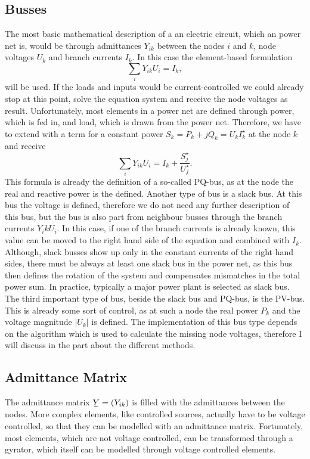 \subsection{Busses}
The most basic mathematical description of a an electric circuit, which an power net is, would be through admittances $Y_{ik}$ between the nodes $i$ and $k$, node voltages $U_k$ and branch currents $I_k$. In this case the element-based formulation
\begin{equation}
	\sum_i Y_{ik} U_i = I_k,
	\label{eq:current_controlled}
\end{equation}
will be used. If the loads and inputs would be current-controlled we could already stop at this point, solve the equation system and receive the node voltages as result. Unfortunately, most elements in a power net are defined through power, which is fed in, and load, which is drawn from the power net. Therefore, we have to extend  with a term for a constant power $S_k = P_k + j Q_k = U_k I_k^\star$ at the node $k$ and receive
\begin{equation}
	\sum_i Y_{ik} U_i = I_k + \frac{S_j^\star}{U_j^\star}.
	\label{eq:pq_bus}
\end{equation}
This formula is already the definition of a so-called PQ-bus, as at the node the real and reactive power is the defined.
Another type of bus is a slack bus. At this bus the voltage is defined, therefore we do not need any further description of this bus, but the bus is also part from neighbour busses through the branch currents $Y_ik U_i$. In this case, if one of the branch currents is already known, this value can be moved to the right hand side of the equation  and combined with $I_k$. Although, slack busses show up only in the constant currents of the right hand sides, there must be always at least one slack bus in the power net, as this bus then defines the rotation of the system and compensates mismatches in the total power sum. In practice, typically a major power plant is selected as slack bus.
The third important type of bus, beside the slack bus and PQ-bus, is the PV-bus. This is already some sort of control, as at such a node the real power $P_k$ and the voltage magnitude $|U_k|$ is defined. The implementation of this bus type depends on the algorithm which is used to calculate the missing node voltages, therefore I will discuss in the part about the different methods.

\subsection{Admittance Matrix}
The admittance matrix $\undertilde Y = (Y_{ik})$ is filled with the admittances between the nodes. More complex elements, like controlled sources, actually have to be voltage controlled, so that they can be modelled with an admittance matrix. Fortunately, most elements, which are not voltage controlled, can be transformed through a gyrator, which itself can be modelled through voltage controlled elements.

